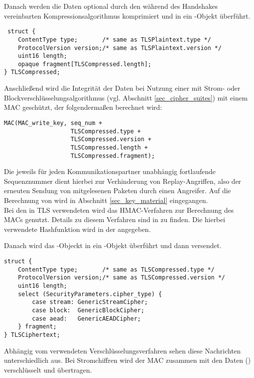 Danach werden die Daten optional durch den während des Handshakes vereinbarten Kompressionsalgorithmus komprimiert und in ein -Objekt überführt.

\begin{lstlisting}
 struct {
	ContentType type;       /* same as TLSPlaintext.type */
	ProtocolVersion version;/* same as TLSPlaintext.version */
	uint16 length;
	opaque fragment[TLSCompressed.length];
} TLSCompressed;
\end{lstlisting}

Anschließend wird die Integrität der Daten bei Nutzung einer \ciphersuite{} mit Strom- oder Blockverschlüsselungsalgorithmus (vgl. Abschnitt \ref{sec_cipher_suites}) mit einem MAC geschützt, der folgendermaßen berechnet wird:
\begin{lstlisting}
MAC(MAC_write_key, seq_num +
				   TLSCompressed.type +
				   TLSCompressed.version +
				   TLSCompressed.length +
				   TLSCompressed.fragment);
\end{lstlisting}
Die jeweils für jeden Kommunikationspartner unabhängig fortlaufende Sequenznummer  dient hierbei zur Verhinderung von Replay-Angriffen, also der erneuten Sendung von mitgelesenen Paketen durch einen Angreifer. Auf die Berechnung von  wird in Abschnitt \ref{sec_key_material} eingegangen.\\
Bei den in TLS verwendeten \ciphersuites{} wird das HMAC-Verfahren zur Berechnung des MACs genutzt. Details zu diesem Verfahren sind in \cite{hmac97} zu finden. Die hierbei verwendete Hashfunktion wird in der \ciphersuite{} angegeben. 

Danach wird das -Objeckt in ein -Objekt überführt und dann versendet.

\begin{lstlisting}
struct {
	ContentType type;       /* same as TLSCompressed.type */
	ProtocolVersion version;/* same as TLSCompressed.version */
	uint16 length;
	select (SecurityParameters.cipher_type) {
	    case stream: GenericStreamCipher;
	    case block:  GenericBlockCipher;
	    case aead:   GenericAEADCipher;
	} fragment;
} TLSCiphertext;
\end{lstlisting}

Abhängig vom verwendeten Verschlüsselungsverfahren sehen diese Nachrichten unterschiedlich aus. Bei Stromchiffren wird der MAC zusammen mit den Daten () verschlüsselt und übertragen. 

